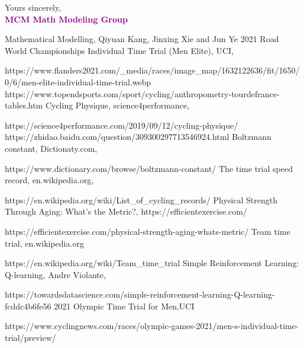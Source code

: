 \documentclass{article}
\begin{document}
	Yours sincerely,\\
	\textcolor{purple}{\textbf{MCM Math Modeling Group}}
	\newpage
	\thispagestyle{empty}
	\renewcommand\refname{References}
	\clearpage
	\begin{thebibliography}{100}
		 Mathematical Modelling, Qiyuan Kang, Jinxing Xie and Jun Ye
		2021 Road World Championships Individual Time Trial (Men Elite), UCI,

		https://www.flanders2021.com/\_media/races/image\_map/1632122636/fit/1650/0/6/men-elite-individual-time-trial.webp
		https://www.topendsports.com/sport/cycling/anthropometry-tourdefrance-tables.htm
		Cycling Physique, science4performance,

		https://science4performance.com/2019/09/12/cycling-physique/
		https://zhidao.baidu.com/question/309300297713546924.html
		Boltzmann constant, Dictionaty.com,

		https://www.dictionary.com/browse/boltzmann-constant/
		The time trial speed record, en.wikipedia.org,

		https://en.wikipedia.org/wiki/List\_of\_cycling\_records/
		Physical Strength Through Aging: What’s the Metric?, https://efficientexercise.com/

		https://efficientexercise.com/physical-strength-aging-whats-metric/
		Team time trial, en.wikipedia.org

		https://en.wikipedia.org/wiki/Team\_time\_trial
		 Simple Reinforcement Learning: Q-learning, Andre Violante,

		 https://towardsdatascience.com/simple-reinforcement-learning-Q-learning-fcddc4b6fe56
		 2021 Olympic Time Trial for Men,UCI

		https://www.cyclingnews.com/races/olympic-games-2021/men-s-individual-time-trial/preview/
	\end{thebibliography}
\end{document}
